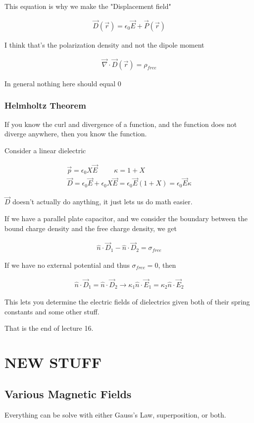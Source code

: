 \documentclass[fleqn]{report}
\newcommand{\hp}{\hspace{1cm}}
\newcommand{\equations} [1] {
\begin{gather*}
#1
\end{gather*}
}
\begin{document}
This equation is why we make the "Displacement field"

\equations{
    \vec D(\vec r)
    =
    \epsilon_0 \vec E + \vec P(\vec r)
}
I think that's the polarization density and not the dipole moment 

\equations{
    \vec \nabla \cdot \vec D(\vec r) = \rho_{free}
}
In general nothing here should equal 0

\subsection{Helmholtz Theorem}
If you know the curl and divergence of a function, and the function does 
not diverge anywhere, then you know the function.

Consider a linear dielectric 
\equations{
    \vec p = \epsilon_0 X \vec E 
    \hp 
    \kappa = 1 + X 
    \\
    \vec D 
    = 
    \epsilon_0 \vec E + \epsilon_0 X \vec E 
    =
    \epsilon_0 \vec E (1 + X)
    =
    \epsilon_0 \vec E \kappa 
}

$\vec D$ doesn't actually do anything, it just lets us do math easier. 

If we have a parallel plate capacitor, and we consider the boundary between 
the bound charge density and the free charge density, we get 
\equations{
    \hat n \cdot \vec D_1 - \hat n \cdot \vec D_2 = \sigma_{free}
}

If we have no external potential and thus $\sigma_{free} = 0$, then 
\equations{
    \hat n \cdot \vec D_1 = \hat n \cdot \vec D_2 
    \rightarrow 
    \kappa_1 \hat n \cdot \vec E_1  = \kappa_2 \hat n \cdot \vec E_2
}

This lets you determine the electric fields of dielectrics given 
both of their spring constants and some other stuff. 

That is the end of lecture 16. 

\chapter{NEW STUFF}


\section{Various Magnetic Fields}
Everything can be solve with either Gauss's Law, superposition, or both. 
\end{document}
